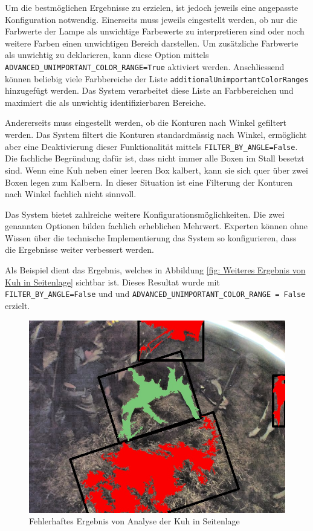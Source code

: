 Um die bestmöglichen Ergebnisse zu erzielen, ist jedoch jeweils eine angepasste Konfiguration notwendig.
Einerseits muss jeweils eingestellt werden, ob nur die Farbwerte der Lampe als unwichtige Farbewerte zu interpretieren sind oder noch weitere Farben einen unwichtigen Bereich darstellen. Um zusätzliche Farbwerte als unwichtig zu deklarieren, kann diese Option mittels \texttt{ADVANCED_UNIMPORTANT_COLOR_RANGE=True} aktiviert werden. Anschliessend können beliebig viele Farbbereiche der Liste \texttt{additionalUnimportantColorRanges} hinzugefügt werden. Das System verarbeitet diese Liste an Farbbereichen und maximiert die als unwichtig identifizierbaren Bereiche.

Andererseits muss eingestellt werden, ob die Konturen nach Winkel gefiltert werden. Das System filtert die Konturen standardmässig nach Winkel, ermöglicht aber eine Deaktivierung dieser Funktionalität mittels \texttt{FILTER_BY_ANGLE=False}. Die fachliche Begründung dafür ist, dass nicht immer alle Boxen im Stall besetzt sind. Wenn eine Kuh neben einer leeren Box kalbert, kann sie sich quer über zwei Boxen legen zum Kalbern. In dieser Situation ist eine Filterung der Konturen nach Winkel fachlich nicht sinnvoll.

Das System bietet zahlreiche weitere Konfigurationsmöglichkeiten. Die zwei genannten Optionen bilden fachlich  erheblichen Mehrwert. Experten können ohne Wissen über die technische Implementierung das System so konfigurieren, dass die Ergebnisse weiter verbessert werden. 

Als Beispiel dient das Ergebnis, welches in Abbildung \ref{fig: Weiteres Ergebnis von Kuh in Seitenlage} sichtbar ist. Dieses Resultat wurde mit \texttt{FILTER_BY_ANGLE=False} und und \texttt{ADVANCED_UNIMPORTANT_COLOR_RANGE = False} erzielt. 
\begin{figure}[H]
	\center
	\includegraphics[scale=0.1]{Grafiken/resultate/resultatFehlerhaft.jpg}
	\caption{Fehlerhaftes Ergebnis von Analyse der Kuh in Seitenlage} 
	\label{fig: Fehlerhaftes Ergebnis von Analyse der Kuh in Seitenlage} 
\end{figure}

